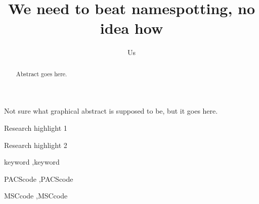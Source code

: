 \documentclass[preprint,12pt]{elsarticle}
\begin{document}
\begin{frontmatter}



\title{We need to beat namespotting, no idea how}


\author{Us}


\begin{abstract}
Abstract goes here. 

\end{abstract}

\begin{graphicalabstract}
Not sure what graphical abstract is supposed to be, but it goes here. 
\end{graphicalabstract}

\begin{highlights}
\item Research highlight 1
\item Research highlight 2
\end{highlights}

\begin{keyword}
 keyword \sep keyword


\PACS PACScode \sep PACScode

\MSC MSCcode \sep MSCcode

\end{keyword}

\end{frontmatter}
\end{document}
